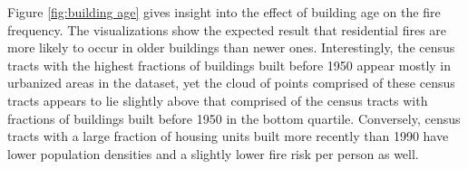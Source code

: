 \documentclass{svjour3}
\begin{document}
Figure \ref{fig:building age} gives insight into the effect of building age on the fire frequency. The visualizations show the expected result that residential fires are more likely to occur in older buildings than newer ones. Interestingly, the census tracts with the highest fractions of buildings built before 1950 appear mostly in urbanized areas in the dataset, yet the cloud of points comprised of these census tracts appears to lie slightly above that comprised of the census tracts with fractions of buildings built before 1950 in the bottom quartile. Conversely, census tracts with a large fraction of housing units built more recently than 1990 have lower population densities and a slightly lower fire risk per person as well.

   \begin{figure}[!ht]
       \begin{center}
          \\ %
\end{center}
\end{figure}
\end{document}

